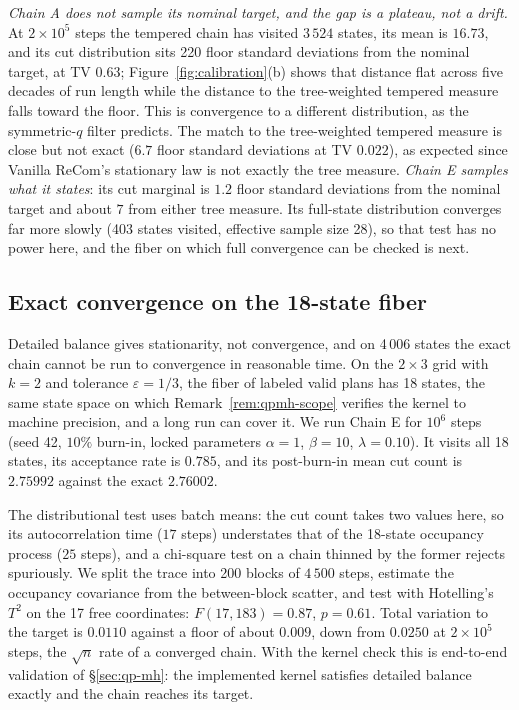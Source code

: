 \documentclass[11pt]{article}
\begin{document}
\emph{Chain A does not sample its nominal target, and the gap is a
plateau, not a drift.} At $2 \times 10^5$ steps the tempered chain has
visited $3\,524$ states, its mean is $16.73$, and its cut distribution
sits 220 floor standard deviations from the nominal target, at TV
$0.63$; Figure~\ref{fig:calibration}(b) shows that distance flat
across five decades of run length while the distance to the
tree-weighted tempered measure falls toward the floor. This is
convergence to a different distribution, as the symmetric-$q$ filter
predicts. The match to the tree-weighted tempered measure is close but
not exact ($6.7$ floor standard deviations at TV $0.022$), as expected
since Vanilla ReCom's stationary law is not exactly the tree measure.
\emph{Chain E samples what it states}: its cut marginal is $1.2$ floor
standard deviations from the nominal target and about $7$ from either
tree measure. Its full-state distribution converges far more slowly
(403 states visited, effective sample size 28), so that test has no
power here, and the fiber on which full convergence can be checked is
next.

\subsection{Exact convergence on the 18-state fiber}\label{sec:exp-2x3}

Detailed balance gives stationarity, not convergence, and on 4\,006
states the exact chain cannot be run to convergence in reasonable
time. On the $2 \times 3$ grid with $k = 2$ and tolerance
$\varepsilon = 1/3$, the fiber of labeled valid plans has 18 states,
the same state space on which Remark~\ref{rem:qpmh-scope} verifies
the kernel to machine precision, and a long run can cover it. We run
Chain E for $10^6$ steps (seed 42, $10\%$ burn-in, locked parameters
$\alpha = 1$, $\beta = 10$, $\lambda = 0.10$). It visits all 18
states, its acceptance rate is $0.785$, and its post-burn-in mean cut
count is $2.75992$ against the exact $2.76002$.

The distributional test uses batch means: the cut count takes two
values here, so its autocorrelation time ($17$ steps) understates that
of the 18-state occupancy process ($25$ steps), and a chi-square test
on a chain thinned by the former rejects spuriously. We split the
trace into 200 blocks of $4\,500$ steps, estimate the occupancy
covariance from the between-block scatter, and test with Hotelling's
$T^2$ on the 17 free coordinates: $F(17, 183) = 0.87$, $p = 0.61$.
Total variation to the target is $0.0110$ against a floor of about
$0.009$, down from $0.0250$ at $2 \times 10^5$ steps, the $\sqrt{n}$
rate of a converged chain. With the kernel check this is end-to-end
validation of \S\ref{sec:qp-mh}: the implemented kernel satisfies
detailed balance exactly and the chain reaches its target.
\end{document}
